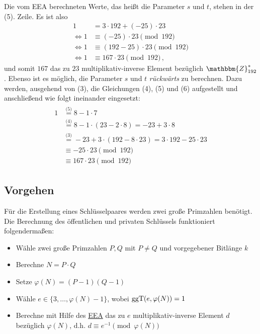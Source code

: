 \begin{beispiel}[EEA]
	Die vom EEA berechneten Werte, das heißt die Parameter $s$ und $t$, stehen in der (5). Zeile. Es ist also 
	\begin{align*}
		1 &= 3 \cdot 192 + (-25) \cdot 23\\
		\Leftrightarrow 1 &\equiv (-25) \cdot 23 \pmod{192}\\
		\Leftrightarrow 1 &\equiv (192 - 25) \cdot 23 \pmod{192}\\ 
		\Leftrightarrow 1 &\equiv 167 \cdot 23 \pmod{192}\, \text{,}
	\end{align*}
	und somit $167$ das zu $23$ multiplikativ-inverse Element bezüglich $\mathbbm{Z}^{\ast}_{192}$.
	Ebenso ist es möglich, die Parameter $s$ und $t$ \emph{rückwärts} zu berechnen. Dazu werden, ausgehend von (3), 
	die Gleichungen (4), (5) und (6) aufgestellt und anschließend wie folgt ineinander eingesetzt:  
	\begin{align*}
		\begin{split}
			1	&\stackrel{\textit{(5)}}{=} 8 - 1 \cdot 7\\
				&\stackrel{\textit{(4)}}{=} 8 - 1 \cdot (23 - 2 \cdot 8) = -23 + 3 \cdot 8\\
				&\stackrel{\textit{(3)}}{=} -23 + 3 \cdot (192 - 8 \cdot 23) = 3 \cdot 192 - 25 \cdot 23\\[.5cm]
				&\equiv -25 \cdot 23 \pmod{192}\\
				&\equiv 167 \cdot 23 \pmod{192}
		\end{split}
	\end{align*}
\end{beispiel}

\subsection{Vorgehen}
\label{ch:asymmenc:rsa:vorgehen}
Für die Erstellung eines Schlüsselpaares werden zwei große Primzahlen benötigt. Die Berechnung des öffentlichen und privaten Schlüssels funktioniert folgendermaßen:
\begin{itemize}
 	\item Wähle zwei große Primzahlen $P, Q$ mit $P \neq Q$ und vorgegebener Bitlänge $k$
 	\item Berechne $N = P \cdot Q$
 	\item Setze $\varphi(N) = (P - 1)(Q - 1)$
 	\item Wähle $e \in \{3, \dotsc, \varphi(N) - 1\}$, wobei $\operatorname{ggT}(e, \varphi(N)) = 1$
 	\item Berechne mit Hilfe des \hyperref[ssec:eea]{EEA} das zu $e$ multiplikativ-inverse Element $d$ bezüglich $\varphi(N)$, d.h. $d \equiv e^{-1} \pmod{\varphi(N)}$
\end{itemize}

